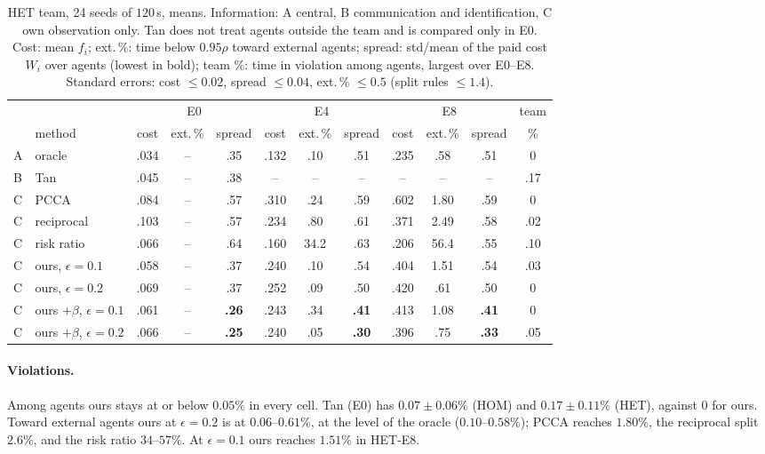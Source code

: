 \documentclass[11pt]{article}
\theoremstyle{definition}
\theoremstyle{remark}
\begin{document}
\begin{table}[h]
\centering\footnotesize\setlength{\tabcolsep}{3.2pt}
\begin{tabular}{llccccccccc c}
\toprule
 & & \multicolumn{3}{c}{E0} & \multicolumn{3}{c}{E4} & \multicolumn{3}{c}{E8} & team\\
\cmidrule(lr){3-5}\cmidrule(lr){6-8}\cmidrule(lr){9-11}
 & method & cost & ext.\,\% & spread & cost & ext.\,\% & spread & cost & ext.\,\% & spread & \%\\
\midrule
A & oracle & .034 & -- & .35 & .132 & .10 & .51 & .235 & .58 & .51 & 0\\
B & Tan & .045 & -- & .38 & -- & -- & -- & -- & -- & -- & .17\\
\midrule
C & PCCA & .084 & -- & .57 & .310 & .24 & .59 & .602 & 1.80 & .59 & 0\\
C & reciprocal & .103 & -- & .57 & .234 & .80 & .61 & .371 & 2.49 & .58 & .02\\
C & risk ratio & .066 & -- & .64 & .160 & 34.2 & .63 & .206 & 56.4 & .55 & .10\\
C & ours, $\epsilon=0.1$ & .058 & -- & .37 & .240 & .10 & .54 & .404 & 1.51 & .54 & .03\\
C & ours, $\epsilon=0.2$ & .069 & -- & .37 & .252 & .09 & .50 & .420 & .61 & .50 & 0\\
C & ours $+\beta$, $\epsilon=0.1$ & .061 & -- & \textbf{.26} & .243 & .34 & \textbf{.41} & .413 & 1.08 & \textbf{.41} & 0\\
C & ours $+\beta$, $\epsilon=0.2$ & .066 & -- & \textbf{.25} & .240 & .05 & \textbf{.30} & .396 & .75 & \textbf{.33} & .05\\
\bottomrule
\end{tabular}
\caption{HET team, 24 seeds of $120$\,s, means. Information: A central, B communication and identification, C own observation only. Tan does not treat agents outside the team and is compared only in E0. Cost: mean $f_i$; ext.\,\%: time below $0.95\rho$ toward external agents; spread: std/mean of the paid cost $W_i$ over agents (lowest in bold); team \%: time in violation among agents, largest over E0--E8. Standard errors: cost $\le0.02$, spread $\le0.04$, ext.\,\% $\le0.5$ (split rules $\le1.4$).}
\label{tab:het}
\end{table}

\paragraph{Violations.} Among agents ours stays at or below $0.05\%$ in every cell. Tan (E0) has $0.07\pm0.06\%$ (HOM) and $0.17\pm0.11\%$ (HET), against $0$ for ours. Toward external agents ours at $\epsilon=0.2$ is at $0.06$--$0.61\%$, at the level of the oracle ($0.10$--$0.58\%$); PCCA reaches $1.80\%$, the reciprocal split $2.6\%$, and the risk ratio $34$--$57\%$. At $\epsilon=0.1$ ours reaches $1.51\%$ in HET-E8.
\end{document}
